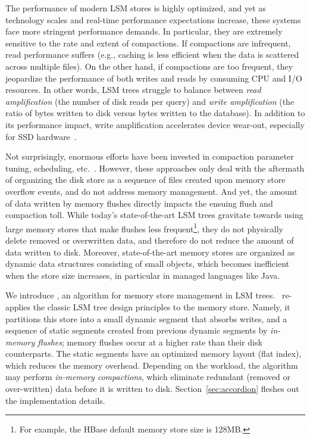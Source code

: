 The performance of modern LSM stores is highly optimized, and yet as technology scales and real-time 
performance expectations increase, these systems face more stringent performance demands. In particular, 
they are extremely sensitive to the rate and extent of compactions. If compactions are infrequent, read performance
suffers (e.g., caching is less efficient when the data is scattered across multiple files). On the other hand, if 
compactions are too frequent, they jeopardize the performance of both writes and reads by consuming CPU 
and I/O resources. In other words, LSM trees struggle to balance between {\em read amplification} (the number 
of disk reads per query) and {\em write amplification} (the ratio of bytes written to disk versus bytes written to the 
database). In addition to its performance impact, write amplification accelerates device wear-out, especially for SSD 
hardware~\cite{Hu:2009}. 

Not surprisingly, enormous efforts have been invested in compaction parameter tuning, scheduling, etc.~\cite{hbasetuning,
universalcompaction,scylladbcompaction,Sears:2012}. However, these approaches only deal with the aftermath
of organizing the disk store as a sequence of files created upon memory store overflow events, and do not 
address memory management. And yet, the amount of data written by memory flushes  
directly impacts the ensuing flush and compaction toll. 
While today's state-of-the-art LSM trees gravitate towards using large memory 
stores that make flushes less frequent\footnote{For example, the HBase default memory store size is 128MB.}, 
they do not physically delete removed or overwritten data,
and therefore do not reduce the amount of data written to disk.
Moreover, state-of-the-art memory stores are organized as dynamic data structures consisting of small objects,
which becomes inefficient when the store size increases, in particular in managed languages like Java. 

We introduce \sys, an algorithm for memory store management in LSM trees. 
\sys\ re-applies the classic LSM tree design principles to the memory store. Namely, it partitions this store
 into a small dynamic segment that absorbs writes, and a sequence of static segments created 
 from previous dynamic segments by \emph{in-memory flushes}; memory flushes occur at a higher rate
 than their disk counterparts.  The static segments have an optimized memory
 layout (flat index), which reduces the memory overhead. Depending on the workload, the algorithm may 
 perform \emph{in-memory compactions}, which eliminate redundant (removed or over-written) data before 
 it is written to disk. 
 Section~\ref{sec:accordion}  fleshes out the implementation details. 
 
